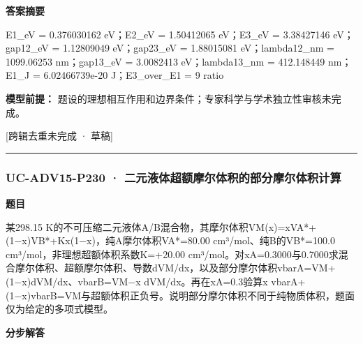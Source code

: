 \documentclass[UTF8,11pt,a4paper]{ctexart}
\begin{document}
\noindent\textbf{答案摘要}\par
E1\_eV = 0.376030162 eV；E2\_eV = 1.50412065 eV；E3\_eV = 3.38427146 eV；gap12\_eV = 1.12809049 eV；gap23\_eV = 1.88015081 eV；lambda12\_nm = 1099.06253 nm；gap13\_eV = 3.0082413 eV；lambda13\_nm = 412.148449 nm；E1\_J = 6.02466739e-20 J；E3\_over\_E1 = 9 ratio\par
\noindent\textbf{模型前提：}
题设的理想相互作用和边界条件；专家科学与学术独立性审核未完成。\par
\noindent\textcolor{red!65!black}{[跨辑去重未完成 · 草稿]} \par
\medskip\hrule\medskip
{}
\subsubsection*{UC-ADV15-P230 · 二元液体超额摩尔体积的部分摩尔体积计算}
\noindent\textbf{题目}\par
某298.15 K的不可压缩二元液体A/B混合物，其摩尔体积VM(x)=xVA*+(1−x)VB*+Kx(1−x)，纯A摩尔体积VA*=80.00 cm³/mol、纯B的VB*=100.0 cm³/mol，非理想超额体积系数K=+20.00 cm³/mol。对xA=0.3000与0.7000求混合摩尔体积、超额摩尔体积、导数dVM/dx，以及部分摩尔体积vbarA=VM+(1−x)dVM/dx、vbarB=VM−x dVM/dx。再在xA=0.3验算x vbarA+(1−x)vbarB=VM与超额体积正负号。说明部分摩尔体积不同于纯物质体积，题面仅为给定的多项式模型。\par
\medskip\noindent\textbf{分步解答}
\end{document}
